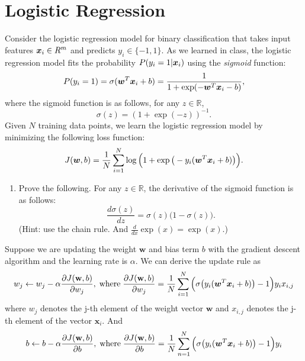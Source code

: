 \section{Logistic Regression }

Consider the logistic regression model for binary classification that takes input features $\boldsymbol{x}_i\in R^m$ and predicts $y_i \in \{-1,1\}$. 
As we learned in class, the logistic regression model fits the probability $P(y_i = 1|\boldsymbol{x}_i)$ using the \textit{sigmoid} function:
\begin{equation}
    P(y_i = 1) = \sigma(\boldsymbol{w}^T \boldsymbol{x}_i+b) = \frac{1}{1+ \exp(-\boldsymbol{w}^T\boldsymbol{x}_i-b)},
\end{equation}
where the sigmoid function is as follows, for any $z\in\mathbb{R}$,
\[
\sigma(z)=(1+\exp(-z))^{-1}.
\]
Given $N$ training data points, we learn the logistic regression model by minimizing the following loss function:
\begin{equation}
\label{eq:j}
J(\boldsymbol{w}, b) = 
  \frac{1}{N} \sum_{i=1}^{N}\log\Big(1+\exp\big(-y_i(\boldsymbol{w}^T \boldsymbol{x}_i+b)\big)\Big).
\end{equation}
\begin{enumerate}
\item {} Prove the following. For any $z\in\mathbb{R}$, the derivative of the sigmoid function is as follows: 
\begin{equation*}
    \frac{d\sigma(z)}{dz} = \sigma(z)\big(1 - \sigma(z)\big).
\end{equation*}
(Hint: use the chain rule. And $\frac{d}{dx}\exp(x)=\exp(x)$.)

\end{enumerate}

Suppose we are updating the weight $\mathbf{w}$ and bias term $b$ with the gradient descent algorithm and the learning rate is $\alpha$. We can derive the update rule as
\[w_j \leftarrow w_j - \alpha\frac{\partial J(\mathbf{w},b)}{\partial w_j},\; \text{where}\; \frac{\partial J(\mathbf{w},b)}{\partial w_j}=\frac{1}{N}\sum_{i=1}^N  \Big(\sigma\big(y_i(\boldsymbol{w}^T \boldsymbol{x}_i+b)\big) - 1\Big) y_ix_{i,j}\]
where $w_j$ denotes the j-th element of the weight vector $\mathbf{w}$ and $x_{i,j}$ denotes the j-th element of the vector $\mathbf{x}_i$. And 
\[
b\leftarrow b-\alpha\frac{\partial J(\mathbf{w},b)}{\partial b},\; \text{where} \;\frac{\partial J(\mathbf{w},b)}{\partial b}=\frac{1}{N}\sum_{n=1}^N\Big(\sigma\big(y_i(\boldsymbol{w}^T \boldsymbol{x}_i+b)\big) - 1\Big) y_i
\]

